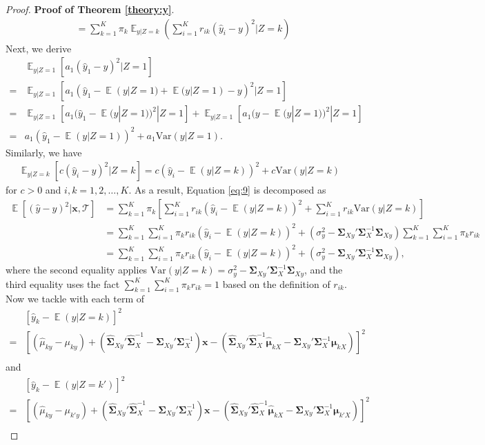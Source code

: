 \documentclass[10pt,a4paper]{amsart}
\DeclareMathOperator{\E}{\mathbb{E}}
\begin{document}
\begin{proof}{\textbf{Proof of Theorem \ref{theory:y}}.}{}
\begin{align*}
&= \sum_{k=1}^K \pi_k \E_{y|Z=k} \left( \sum_{i=1}^K r_{ik} (\hat{y}_i-y)^2 | Z = k \right)
\end{align*}
Next, we derive
\begin{align*}
&\E_{y|Z=1}\left[a_1(\hat{y}_1-y)^2|Z=1\right]  \\
=& \E_{y|Z=1}\left[a_1(\hat{y}_1-\E(y|Z=1)+\E(y|Z=1)-y)^2|Z=1\right]\\
=&\E_{y|Z=1}\left[a_1(\hat{y}_1-\E(y|Z=1))^2|Z=1\right]+\E_{y|Z=1}\left[a_1(y-\E(y|Z=1))^2|Z=1\right]\\
=& a_1(\hat{y}_1-\E(y|Z=1))^2+a_1 \mbox{Var}(y|Z=1).
\end{align*}
Similarly, we have
\begin{align*}
\E_{y|Z=k} \left[ c (\hat{y}_i - y)^2|Z=k \right]
= c(\hat{y}_i - \E(y|Z=k))^2 + c \mbox{Var}(y|Z=k)
\end{align*}
for $c > 0$ and $i, k = 1,2,\ldots,K$.
As a result, Equation \eqref{eq:9} is decomposed as
\begin{align*}
\E[(\hat{y}-y)^2|\bm x, \mathcal{T}] &= \sum_{k=1}^K \pi_k \left[ \sum_{i=1}^K r_{ik} (\hat{y}_i - \E(y|Z=k))^2 + \sum_{i=1}^K r_{ik} \mbox{Var}(y|Z=k) \right] \\
&= \sum_{k=1}^K \sum_{i=1}^K \pi_k r_{ik} (\hat{y}_i - \E(y|Z=k))^2 + (\sigma_y^2 - \bm \Sigma_{Xy}' \bm \Sigma_{X}^{-1} \bm \Sigma_{Xy}) \sum_{k=1}^K \sum_{i=1}^K \pi_k r_{ik} \\
&= \sum_{k=1}^K \sum_{i=1}^K \pi_k r_{ik} (\hat{y}_i - \E(y|Z=k))^2 + (\sigma_y^2 - \bm \Sigma_{Xy}' \bm \Sigma_{X}^{-1} \bm \Sigma_{Xy}),
\end{align*}
where the second equality applies $\mbox{Var}(y|Z=k) = \sigma_y^2 - \bm \Sigma_{Xy}' \bm \Sigma_{X}^{-1} \bm \Sigma_{Xy}$,
and the third equality uses the fact $\sum_{k=1}^K \sum_{i=1}^K \pi_k r_{ik} = 1$ based on the definition of $r_{ik}$.
Now we tackle with each term of
\begin{align*}
&[\hat{y}_k - \E(y|Z=k)]^2    \\
=&\left[(\hat{\mu}_{ky}-\mu_{ky})+\left(\hat{\bm \Sigma}_{Xy}' \hat{\bm \Sigma}_{X}^{-1}-\bm \Sigma_{Xy}' \bm \Sigma_{X}^{-1}\right) \bm x - \left(\hat{\bm \Sigma}_{Xy}' \hat{\bm \Sigma}_{X}^{-1} \hat{\bm \mu}_{kX}-\bm \Sigma_{Xy}' \bm \Sigma_{X}^{-1} \bm \mu_{kX} \right) \right]^2 \\
\end{align*}
and
\begin{align*}
&\left[\hat{y}_k-\E(y|Z=k')\right]^2  \\
=&\left[(\hat{\mu}_{ky}-\mu_{k'y})+\left(\hat{\bm \Sigma}_{Xy}' \hat{\bm \Sigma}_{X}^{-1}-\bm \Sigma_{Xy}' \bm \Sigma_{X}^{-1} \right)\bm x - \left(\hat{\bm \Sigma}_{Xy}' \hat{\bm \Sigma}_{X}^{-1} \hat{\bm \mu}_{kX}-\bm \Sigma_{Xy}' \bm \Sigma_{X}^{-1}\bm \mu_{k'X}\right)\right]^2\\

\end{align*}
\end{proof}
\end{document}
